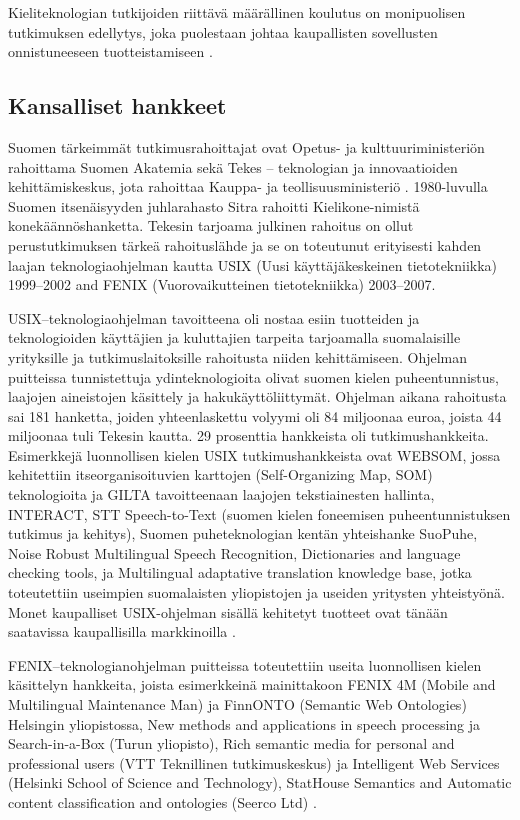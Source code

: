 \begin{multicols}{2}
Kieliteknologian tutkijoiden riittävä määrällinen koulutus on monipuolisen tutkimuksen edellytys, joka puolestaan johtaa kaupallisten sovellusten onnistuneeseen tuotteistamiseen \cite{FinExp}.

\subsection{Kansalliset hankkeet}

Suomen tärkeimmät tutkimusrahoittajat ovat Opetus- ja kulttuuriministeriön rahoittama Suomen Akatemia sekä Tekes – teknologian ja innovaatioiden kehittämiskeskus, jota rahoittaa Kauppa- ja teollisuusministeriö \cite{Leading}. 1980-luvulla Suomen itsenäisyyden juhlarahasto Sitra rahoitti Kielikone-nimistä konekäännöshanketta. Tekesin tarjoama julkinen rahoitus on ollut perustutkimuksen tärkeä rahoituslähde ja se on toteutunut erityisesti kahden laajan teknologiaohjelman kautta USIX (Uusi käyttäjäkeskeinen tietotekniikka) 1999--2002 and FENIX (Vuorovaikutteinen tietotekniikka) 2003--2007.

USIX–teknologiaohjelman tavoitteena oli nostaa esiin tuotteiden ja teknologioiden käyttäjien ja kuluttajien tarpeita tarjoamalla suomalaisille yrityksille ja tutkimuslaitoksille rahoitusta niiden kehittämiseen. Ohjelman puitteissa tunnistettuja ydinteknologioita olivat suomen kielen puheentunnistus, laajojen aineistojen käsittely ja hakukäyttöliittymät. Ohjelman aikana rahoitusta sai 181 hanketta, joiden yhteenlaskettu volyymi oli 84 miljoonaa euroa, joista 44 miljoonaa tuli Tekesin kautta. 29 prosenttia hankkeista oli tutkimushankkeita. Esimerkkejä luonnollisen kielen USIX tutkimushankkeista ovat WEBSOM, jossa kehitettiin itseorganisoituvien karttojen (Self-Organizing Map, SOM) teknologioita ja GILTA tavoitteenaan laajojen tekstiainesten hallinta, INTERACT, STT Speech-to-Text (suomen kielen foneemisen puheentunnistuksen tutkimus ja kehitys), Suomen puheteknologian kentän yhteishanke SuoPuhe, Noise Robust Multilingual Speech Recognition, Dictionaries and language checking tools, ja Multilingual adaptative translation knowledge base, jotka toteutettiin useimpien suomalaisten yliopistojen ja useiden yritysten yhteistyönä. Monet kaupalliset USIX-ohjelman sisällä kehitetyt tuotteet ovat tänään saatavissa kaupallisilla markkinoilla \cite{LoppuUSIX}.

FENIX–teknologianohjelman puitteissa toteutettiin useita luonnollisen kielen käsittelyn hankkeita, joista esimerkkeinä mainittakoon FENIX 4M (Mobile and Multilingual Maintenance Man) ja FinnONTO (Semantic Web Ontologies) Helsingin yliopistossa, New methods and applications in speech processing ja Search-in-a-Box (Turun yliopisto), Rich semantic media for personal and professional users (VTT Teknillinen tutkimuskeskus) ja Intelligent Web Services (Helsinki School of Science and Technology), StatHouse Semantics and Automatic content classification and ontologies (Seerco Ltd) \cite{LoppuFENIX}.


\end{multicols}
